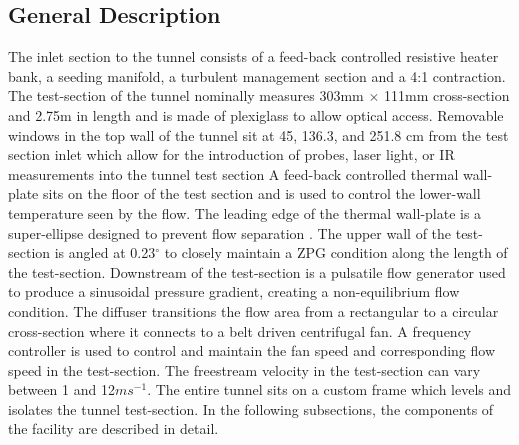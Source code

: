 \subsection{General Description}
The inlet section to the tunnel consists of a feed-back controlled resistive heater bank, a seeding manifold, a turbulent management section and a 4:1 contraction. 
The test-section of the tunnel nominally measures 303mm $\times$ 111mm cross-section and 2.75m in length and is made of plexiglass to allow optical access.
Removable windows in the top wall of the tunnel sit at 45, 136.3, and 251.8 cm from the test section inlet which allow for the introduction of probes, laser light, or IR measurements into the tunnel test section 
A feed-back controlled thermal wall-plate sits on the floor of the test section and is used to control the lower-wall temperature seen by the flow. 
The leading edge of the thermal wall-plate is a super-ellipse designed to prevent flow separation \cite{R.Narasimha1994}. 
The upper wall of the test-section is angled at 0.23$^\circ$ to closely maintain a ZPG condition along the length of the test-section. 
Downstream of the test-section is a pulsatile flow generator used to produce a sinusoidal pressure gradient, creating a non-equilibrium flow condition. 
The diffuser transitions the flow area from a rectangular to a circular cross-section where it connects to a belt driven centrifugal fan.  
A frequency controller is used to control and maintain the fan speed and corresponding flow speed in the test-section. 
The freestream velocity in the test-section can vary between 1 and 12$ms^{-1}$. 
The entire tunnel sits on a custom frame which levels and isolates the tunnel test-section.
In the following subsections,  the components of the facility are described in detail.


